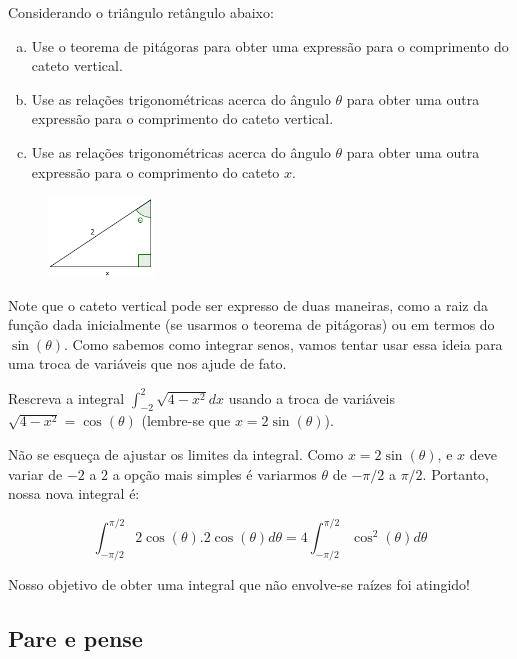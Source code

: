 \documentclass[main_estudante.tex]{subfiles}
\begin{document}
\begin{questao}
Considerando o triângulo retângulo abaixo:
\begin{enumerate}[a)]
\item Use o teorema de pitágoras para obter uma expressão para o comprimento do cateto vertical.
\item Use as relações trigonométricas acerca do ângulo $\theta$ para obter uma outra expressão para o comprimento do cateto vertical.
\item Use as relações trigonométricas acerca do ângulo $\theta$ para obter uma outra expressão para o comprimento do cateto $x$.
\end{enumerate}
\end{questao}

\begin{figure}[h]
\centering
\includegraphics[width=0.25\textwidth]{./img/l2q4.png}
\end{figure}

Note que o cateto vertical pode ser expresso de duas maneiras, como a raiz da função dada inicialmente (se usarmos o teorema de pitágoras) ou em termos do $\sin(\theta)$. Como sabemos como integrar senos, vamos tentar usar essa ideia para uma troca de variáveis que nos ajude de fato.

\begin{questao}
Rescreva a integral $\int_{-2}^{2} \sqrt{4-x^2}dx$ usando a troca de variáveis $\sqrt{4-x^2}=\cos(\theta)$ (lembre-se que $x=2\sin(\theta)$).
\end{questao}

Não se esqueça de ajustar os limites da integral. Como $x=2\sin(\theta)$, e $x$ deve variar de $-2$ a $2$ a opção mais simples é variarmos $\theta$ de $-\pi/2$ a $\pi/2$. Portanto, nossa nova integral é:

$$\int_{-\pi/2}^{\pi/2} 2\cos(\theta). 2\cos(\theta)d\theta = 4 \int_{-\pi/2}^{\pi/2} \cos^2(\theta)d\theta$$

Nosso objetivo de obter uma integral que não envolve-se raízes foi atingido!

\subsection*{Pare e pense}
\end{document}
